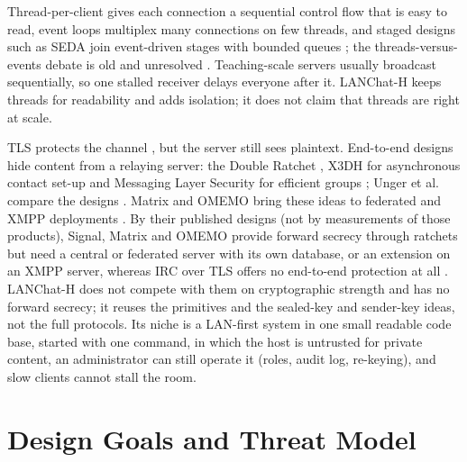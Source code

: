 \documentclass[graybox]{svmult}
\newcommand{\lch}{\mbox{LANChat-H}}
\begin{document}
 Thread-per-client gives each connection a sequential control flow that is easy to read, event loops multiplex many connections on few threads, and staged designs such as SEDA join event-driven stages with bounded queues \cite{seda}; the threads-versus-events debate is old and unresolved \cite{lee}. Teaching-scale servers usually broadcast sequentially, so one stalled receiver delays everyone after it. \lch{} keeps threads for readability and adds isolation; it does not claim that threads are right at scale.

 TLS protects the channel \cite{rfc8446}, but the server still sees plaintext. End-to-end designs hide content from a relaying server: the Double Ratchet \cite{signal,cohngordon}, X3DH for asynchronous contact set-up \cite{x3dh} and Messaging Layer Security for efficient groups \cite{rfc9420}; Unger et al. compare the designs \cite{unger}. Matrix and OMEMO bring these ideas to federated and XMPP deployments \cite{matrix,omemo}. By their published designs (not by measurements of those products), Signal, Matrix and OMEMO provide forward secrecy through ratchets but need a central or federated server with its own database, or an extension on an XMPP server, whereas IRC over TLS offers no end-to-end protection at all \cite{rfc1459}. \lch{} does not compete with them on cryptographic strength and has no forward secrecy; it reuses the primitives and the sealed-key and sender-key ideas, not the full protocols. Its niche is a LAN-first system in one small readable code base, started with one command, in which the host is untrusted for private content, an administrator can still operate it (roles, audit log, re-keying), and slow clients cannot stall the room.



\section{Design Goals and Threat Model}
\label{sec:goals}
\end{document}
